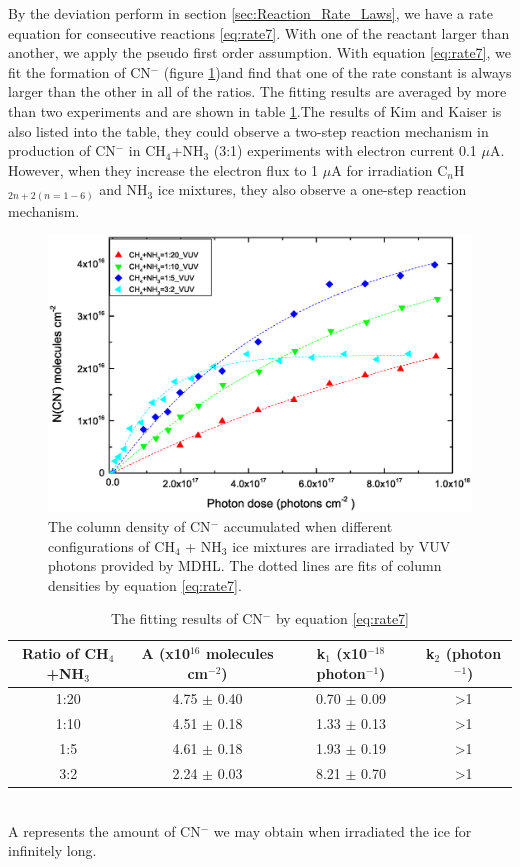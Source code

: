 By the deviation perform in section \ref{sec:Reaction_Rate_Laws}, we have a rate equation for consecutive reactions \ref{eq:rate7}. With one of the reactant larger than another, we apply the pseudo first order assumption. With equation \ref{eq:rate7}, we fit the formation of CN$^-$ (figure \ref{fig:CNrate})and find that one of the rate constant is always larger than the other in all of the ratios. The fitting results are averaged by more than two experiments and are shown in table \ref{tab:CNrate}.The results of Kim and Kaiser is also listed into the table, they could observe a two-step reaction mechanism in production of CN$^-$ in CH$_4$+NH$_3$ (3:1) experiments with electron current 0.1 $\mu$A. However, when they increase the electron flux to 1 $\mu$A for irradiation C$_n$H$_{2n+2 (n=1-6)}$ and NH$_3$ ice mixtures, they also observe a one-step reaction mechanism.

\begin{figure}
\centering
\includegraphics[width=\textwidth]{figures/chapter3/Overall_CN_rate.eps}
\caption{The column density of CN$^-$ accumulated when different configurations of CH$_4$ + NH$_3$ ice mixtures are irradiated by VUV photons provided by MDHL. The dotted lines are fits of column densities by equation \ref{eq:rate7}.}
\label{fig:CNrate}
\end{figure}

\begin{table}[htbp]
\caption{The fitting results of CN$^-$ by equation \ref{eq:rate7}}
\label{tab:CNrate}
\begin{tabular}{cccc}
\hline
\hline
Ratio of CH$_4$+NH$_3$ & A (x10$^{16}$ molecules cm$^{-2}$) & k$_1$ (x10$^{-18}$ photon$^{-1}$) & k$_2$ (photon$^{-1}$)\\
\hline
1:20 & 4.75 $\pm$ 0.40 & 0.70 $\pm$ 0.09 & >1 \\
1:10 & 4.51 $\pm$ 0.18 & 1.33 $\pm$ 0.13 & >1 \\
1:5 & 4.61 $\pm$ 0.18 & 1.93 $\pm$ 0.19 & >1 \\
3:2 & 2.24 $\pm$ 0.03 & 8.21 $\pm$ 0.70 & >1 \\
\hline
\end{tabular}\\
A represents the amount of CN$^-$ we may obtain when irradiated the ice for infinitely long.\
\end{table}

